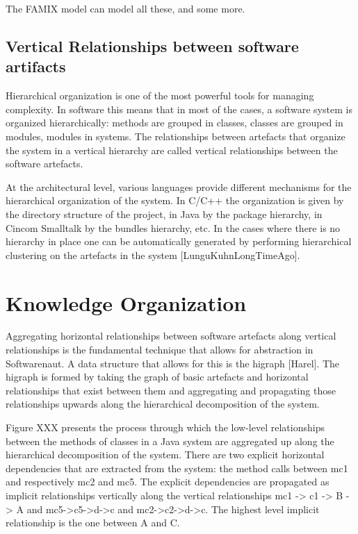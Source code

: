 \documentclass[preprint,12pt]{elsarticle}
\begin{document}
The FAMIX model can model all these, and some more.


\subsection {Vertical Relationships between software artifacts}

Hierarchical organization is one of the most powerful tools for managing complexity. In software this means that in most of the cases, a software system is organized hierarchically: methods are grouped in classes, classes are grouped in modules, modules in systems. The relationships between artefacts that organize the system in a vertical hierarchy are called vertical relationships between the software artefacts. 

At the architectural level, various languages provide different mechanisms for the hierarchical organization of the system. In C/C++ the organization is given by the directory structure of the project, in Java by the package hierarchy, in Cincom Smalltalk by the bundles hierarchy, etc. In the cases where there is no hierarchy in place one can be automatically generated by performing hierarchical clustering on the artefacts in the system [LunguKuhnLongTimeAgo]. 


\section {Knowledge Organization}

Aggregating horizontal relationships between software artefacts along vertical  relationships is the fundamental technique that allows for abstraction in Softwarenaut. A data structure that allows for this is the higraph [Harel]. The higraph is formed by taking the graph of basic artefacts and horizontal relationships that exist between them and aggregating and propagating those relationships upwards along the hierarchical decomposition of the system. 

Figure XXX presents the process through which the low-level relationships between the methods of classes in a Java system are aggregated up along the hierarchical decomposition of the system. There are two explicit horizontal dependencies that are extracted from the system: the method calls between mc1 and respectively mc2 and mc5. 
The explicit dependencies are propagated as implicit relationships vertically along the vertical relationships mc1 -> c1 -> B -> A and mc5->c5->d->c and mc2->c2->d->c. The highest level implicit relationship is the one between A and C. 
\end{document}
